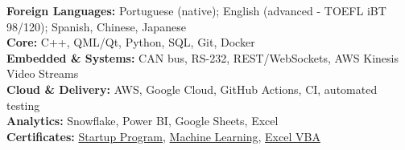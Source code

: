 
\textbf{Foreign Languages:}
Portuguese (native); English (advanced - TOEFL iBT 98/120); Spanish, Chinese, Japanese
\vspace{-0.2em}\\
\textbf{Core:}
C++, QML/Qt, Python, SQL, Git, Docker
\vspace{-0.2em}\\
\textbf{Embedded \& Systems:}
CAN bus, RS-232, REST/WebSockets, AWS Kinesis Video Streams
\vspace{-0.2em}\\
\textbf{Cloud \& Delivery:}
AWS, Google Cloud, GitHub Actions, CI, automated testing
\vspace{-0.2em}\\
\textbf{Analytics:}
 Snowflake, Power BI, Google Sheets, Excel
\vspace{-0.2em}\\
\textbf{Certificates:}
{\color{linkBlue} \href{https://e-certificado.com/login/visualizar?c=664024A5B7D718B4639950}{Startup Program}},
{\color{linkBlue} \href{https://cursos.alura.com.br/degree/certificate/98f57b77-ffe3-4062-b69c-7259b0fd74c6}{Machine Learning}},
{\color{linkBlue} \href{https://cursos.alura.com.br/degree/certificate/68d6f5b3-3a07-4fac-9f6b-f42f04e131ca}{Excel VBA}}

